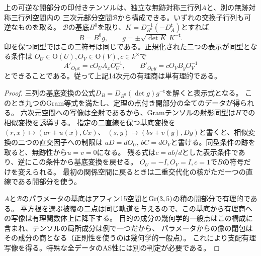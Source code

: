 \begin{proposition}[印付きの一般窓を構成するパラメータ]\label{prop:marked-net-parameters}
上の可逆な開部分の印付きテンソルは、独立な無跡対称三行列$A$と、別の無跡対称三行列空間内の
三次元部分空間$\mathcal B$から構成できる。いずれの交換子行列も可逆なものを取る。
$\mathcal B$の基底$B^0$を取り、$K=D_{B^0}^{-1}(-D_A^{\mathsf t})$とすれば
\[
 B=B^0 g,\qquad g=\pm\sqrt{\det K}\,K^{-\mathsf t}.
\]
印を保つ同型ではこの二符号は同じである。正規化された二つの表示が同型となる条件は
$O_U\in\mathrm O(U), O_V\in\mathrm O(V), c\in k^\times$で
\[
 A'_{O_V x}=c O_U A_x O_U^{-1},\qquad
 B'_{O_U y}=c O_V B_y O_V^{-1}
\]
とできることである。従って上記14次元の有理商は単有理的である。
\end{proposition}
\begin{proof}
三列の基底変換の公式$D_B=D_{B^0}(\det g)g^{-\mathsf t}$を解くと表示式となる。
このとき九つのGram等式を満たし、定理の点付き開部分の全てのデータが得られる。
六次元空間への写像は全射であるから、Gramテンソルの射影同型は$H$での相似変換を誘導する。
指定の二直線を保つ基底変換を$(r,x)\mapsto(a r+u(x),C x)$、
$(s,y)\mapsto(b s+v(y),D y)$と書くと、相似変換の二つの直交因子への制限は
$aD=d O_U$, $bC=d O_V$と書ける。同型条件の跡を取ると、無跡性から$u=v=0$になる。
残る式は$c=ab/d$とした表示条件であり、逆にこの条件から基底変換を戻せる。
$O_U=-I,O_V=I,c=1$で$B$の符号だけを変えられる。
最初の関係空間に戻るときは二重交代化の核がただ一つの直線である開部分を使う。

$A$と$\mathcal B$のパラメータの基底はアフィン15空間と$\operatorname{Gr}(3,5)$の積の開部分で有理的である。
平方根を選ぶ被覆の二点は同じ軌道を与えるので、この基底から有理商への写像は有理関数体上に降下する。
目的の成分の幾何学的一般点はこの構成に含まれ、テンソルの局所成分は例で一つだから、
パラメータからの像の閉包はその成分の商となる（正則性を使うのは幾何学的一般点）。
これにより支配有理写像を得る。特殊な全データのAS性には別の判定が必要である。
\end{proof}
